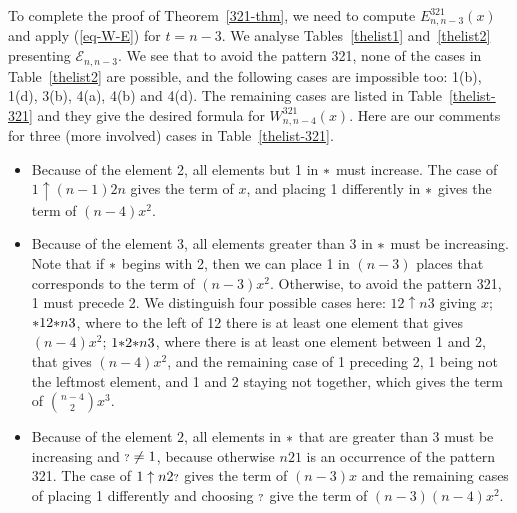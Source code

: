 \documentclass[11pt]{article}
\newcommand{\exactly}[2]{\ensuremath{\mathcal{E}_{#1,#2}}}
\newcommand{\st}{\mbox{\ensuremath{\ast}}}
\newcommand{\q}{\mbox{\ensuremath{\scriptstyle{?}}}}
\newcommand{\+}{\mbox{\ensuremath{\scriptstyle{+}}}}
\begin{document}
To complete the proof of Theorem~\ref{321-thm}, we need to compute $E^{321}_{n,n-3}(x)$ and apply (\ref{eq-W-E}) for $t=n-3$. We analyse Tables~\ref{thelist1} and~\ref{thelist2} presenting $\exactly{n}{n-3}$. We see that to avoid the pattern 321, none of the cases in Table~\ref{thelist2} are possible, and the following cases are impossible too: 1(b), 1(d), 3(b), 4(a), 4(b) and 4(d). The remaining cases are listed in Table~\ref{thelist-321} and they give the desired formula for $W^{321}_{n,n-4}(x)$. Here are our comments for three (more involved) cases in Table~\ref{thelist-321}.
\begin{itemize}
	\item[1(a)] Because of the element 2, all elements but 1 in $\st$ must increase. The case of $1\uparrow(n-1)2n$ gives the term of $x$, and placing 1 differently in $\st$ gives the term of $(n-4)x^2$.
	\item[2(a)] Because of the element 3, all elements  greater than 3  in $\st$ must be increasing. Note that if $\st$ begins with 2, then we can place 1 in $(n-3)$ places that corresponds to the term of $(n-3)x^2$. Otherwise, to avoid the pattern 321, 1 must precede 2. We distinguish four possible cases here: $12\uparrow n3$ giving $x$; $\st 12 \st n3$, where to the left of 12 there is at least one element that gives $(n-4)x^2$; $1\st 2\st n3$, where there is at least one element between 1 and 2, that gives $(n-4)x^2$, and the remaining case of 1 preceding 2, 1 being not the leftmost element, and 1 and 2 staying not together, which gives the term of ${n-4 \choose 2}x^3$.
	\item[3(a)] Because of the element $2$, all elements in $\st$ that are  greater than 3  must be increasing and $\q\neq 1$, because otherwise $n21$ is an occurrence of the pattern 321. The case of $1\uparrow n2\q$ gives the term of $(n-3)x$ and the remaining cases of placing 1 differently and choosing $\q$ give the term of {$(n-3)(n-4)x^2$}.
\end{itemize}
\end{document}
